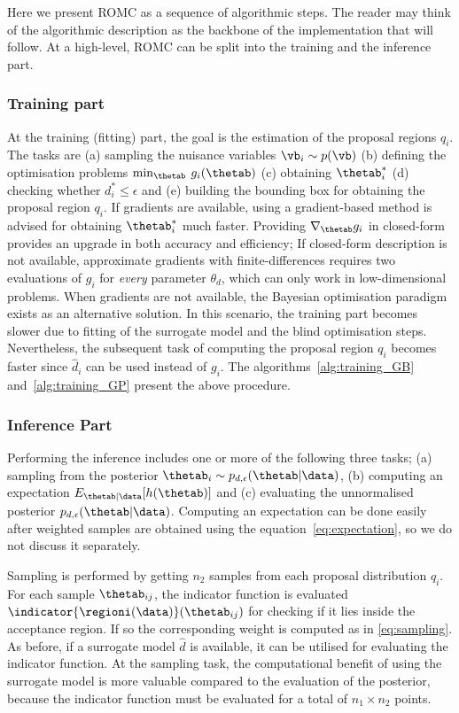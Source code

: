 Here we present ROMC as a sequence of algorithmic steps. The reader
may think of the algorithmic description as the backbone of the
implementation that will follow. At a high-level, ROMC can be split
into the training and the inference part.

\subsubsection*{Training part}
\noindent
At the training (fitting) part, the goal is the estimation of the
proposal regions $q_i$. The tasks are (a) sampling the nuisance
variables $\vb_i \sim p(\vb)$ (b) defining the optimisation problems
$\min_{\thetab} \: g_i(\thetab)$ (c) obtaining $\thetab_i^*$ (d)
checking whether $d_i^* \leq \epsilon$ and (e) building the bounding
box for obtaining the proposal region $q_i$. If gradients are
available, using a gradient-based method is advised for obtaining
$\thetab_i^*$ much faster. Providing $\nabla_{\thetab} g_i$ in
closed-form provides an upgrade in both accuracy and efficiency; If
closed-form description is not available, approximate gradients with
finite-differences requires two evaluations of $g_i$ for \emph{every}
parameter $\theta_d$, which can only work in low-dimensional
problems. When gradients are not available, the Bayesian optimisation
paradigm exists as an alternative solution. In this scenario, the
training part becomes slower due to fitting of the surrogate model and
the blind optimisation steps. Nevertheless, the subsequent task of
computing the proposal region $q_i$ becomes faster since $\hat{d}_i$
can be used instead of $g_i$. The algorithms~\ref{alg:training_GB}
and~\ref{alg:training_GP} present the above procedure.

\subsubsection*{Inference Part}
Performing the inference includes one or more of the following three
tasks; (a) sampling from the posterior
$ \thetab_i \sim p_{d, \epsilon}(\thetab|\data)$, (b) computing an
expectation $E_{\thetab|\data}[h(\thetab)]$ and (c) evaluating the
unnormalised posterior $p_{d, \epsilon}(\thetab|\data)$. Computing an
expectation can be done easily after weighted samples are obtained
using the equation~\ref{eq:expectation}, so we do not discuss it
separately.

\noindent
Sampling is performed by getting $n_2$ samples from each proposal
distribution $q_i$. For each sample $\thetab_{ij}$, the indicator
function is evaluated $\indicator{\regioni(\data)}(\thetab_{ij})$ for
checking if it lies inside the acceptance region. If so the
corresponding weight is computed as in \eqref{eq:sampling}. As before,
if a surrogate model $\hat{d}$ is available, it can be utilised for
evaluating the indicator function. At the sampling task, the
computational benefit of using the surrogate model is more valuable
compared to the evaluation of the posterior, because the indicator
function must be evaluated for a total of $n_1 \times n_2$ points.

